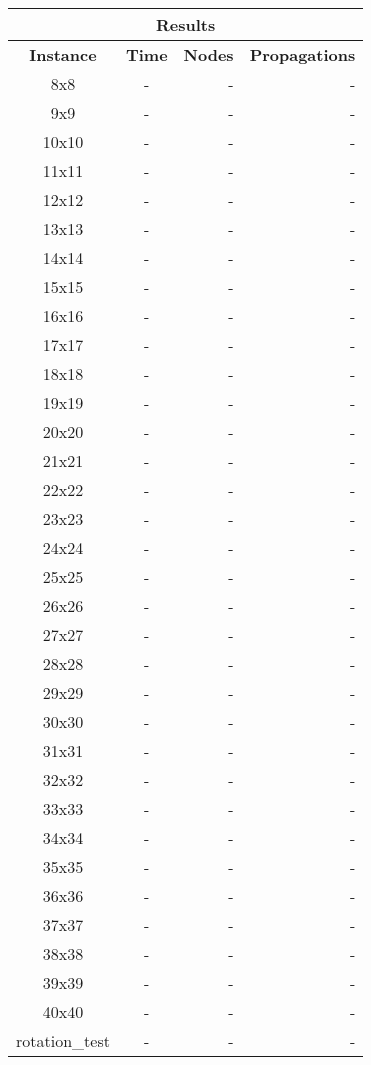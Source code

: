 
\begin{center}
    \begin{tabular}{|c|c|r|r|}
        \hline
        \multicolumn{4}{|c|}{\textbf{Results}} \\
        \hline
        \textbf{Instance} & \textbf{Time} & \textbf{Nodes} & \textbf{Propagations} \\
        
        \hline
		8x8 & - & - & - \\ \hline
		9x9 & - & - & - \\ \hline
		10x10 & - & - & - \\ \hline
		11x11 & - & - & - \\ \hline
		12x12 & - & - & - \\ \hline
		13x13 & - & - & - \\ \hline
		14x14 & - & - & - \\ \hline
		15x15 & - & - & - \\ \hline
		16x16 & - & - & - \\ \hline
		17x17 & - & - & - \\ \hline
		18x18 & - & - & - \\ \hline
		19x19 & - & - & - \\ \hline
		20x20 & - & - & - \\ \hline
		21x21 & - & - & - \\ \hline
		22x22 & - & - & - \\ \hline
		23x23 & - & - & - \\ \hline
		24x24 & - & - & - \\ \hline
		25x25 & - & - & - \\ \hline
		26x26 & - & - & - \\ \hline
		27x27 & - & - & - \\ \hline
		28x28 & - & - & - \\ \hline
		29x29 & - & - & - \\ \hline
		30x30 & - & - & - \\ \hline
		31x31 & - & - & - \\ \hline
		32x32 & - & - & - \\ \hline
		33x33 & - & - & - \\ \hline
		34x34 & - & - & - \\ \hline
		35x35 & - & - & - \\ \hline
		36x36 & - & - & - \\ \hline
		37x37 & - & - & - \\ \hline
		38x38 & - & - & - \\ \hline
		39x39 & - & - & - \\ \hline
		40x40 & - & - & - \\ \hline
		rotation\_test & - & - & - \\ \hline

    \end{tabular}
\end{center}
